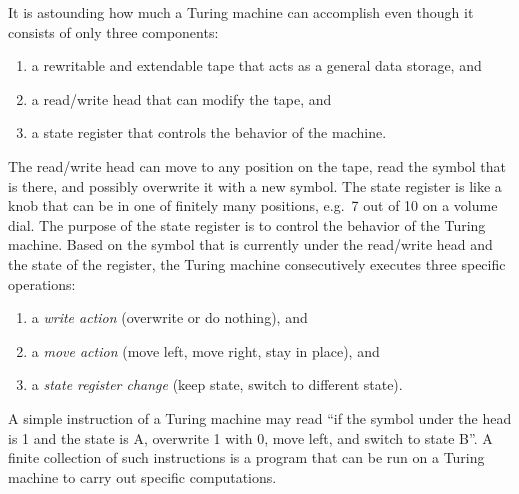It is astounding how much a Turing machine can accomplish even though it consists of only three components:
%
\begin{enumerate}
    \item a rewritable and extendable tape that acts as a general data storage, and
    \item a read/write head that can modify the tape, and
    \item a state register that controls the behavior of the machine.
\end{enumerate}
%
The read/write head can move to any position on the tape, read the symbol that is there, and possibly overwrite it with a new symbol.
The state register is like a knob that can be in one of finitely many positions, e.g.\ 7 out of 10 on a volume dial.
The purpose of the state register is to control the behavior of the Turing machine.
Based on the symbol that is currently under the read/write head and the state of the register, the Turing machine consecutively executes three specific operations: 
%
\begin{enumerate}
    \item a \emph{write action} (overwrite or do nothing), and
    \item a \emph{move action} (move left, move right, stay in place), and
    \item a \emph{state register change} (keep state, switch to different state).
\end{enumerate}
%
A simple instruction of a Turing machine may read ``if the symbol under the head is 1 and the state is A, overwrite 1 with 0, move left, and switch to state B''.
A finite collection of such instructions is a program that can be run on a Turing machine to carry out specific computations.

